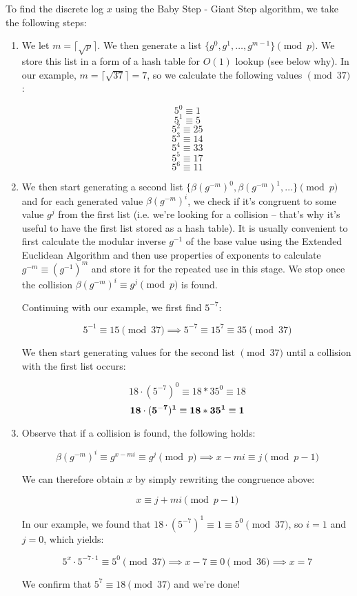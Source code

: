 \documentclass{article}
\begin{document}
      To find the discrete log $x$ using the Baby Step - Giant Step algorithm, we take the following steps:
      \begin{enumerate}

        \item We let $m = \lceil{\sqrt{p}}\rceil$. We then generate a list $\{g^0, g^1, \ldots, g^{m-1}\} \pmod{p}$. We store this list in a form of a hash table for $O(1)$ lookup (see below why). In our example, $m = \lceil{\sqrt{37}}\rceil = 7$, so we calculate the following values $\pmod{37}$:

          $$5^0 \equiv 1$$
          $$5^1 \equiv 5$$
          $$5^2 \equiv 25$$
          $$5^3 \equiv 14$$
          $$5^4 \equiv 33$$
          $$5^5 \equiv 17$$
          $$5^6 \equiv 11$$

        \item We then start generating a second list $\{\beta(g^{-m})^0, \beta(g^{-m})^1, \ldots\} \pmod{p}$ and for each generated value $\beta(g^{-m})^i$, we check if it's congruent to some value $g^j$ from the first list (i.e. we're looking for a collision -- that's why it's useful to have the first list stored as a hash table). It is usually convenient to first calculate the modular inverse $g^{-1}$ of the base value using the Extended Euclidean Algorithm and then use properties of exponents to calculate $g^{-m} \equiv (g^{-1})^m$ and store it for the repeated use in this stage. We stop once the collision $\beta(g^{-m})^i \equiv g^{j} \pmod{p}$ is found.

          Continuing with our example, we first find $5^{-7}$:

          $$5^{-1} \equiv 15 \pmod{37} \implies 5^{-7} \equiv 15^7 \equiv 35 \pmod{37}$$

          We then start generating values for the second list $\pmod{37}$ until a collision with the first list occurs:

          $$18 \cdot (5^{-7})^0 \equiv 18 * 35^0 \equiv 18$$
          $$\bf{18 \cdot (5^{-7})^1 \equiv 18 * 35^1 \equiv 1}$$

        \item Observe that if a collision is found, the following holds:

          $$\beta(g^{-m})^i \equiv g^{x-mi} \equiv g^{j} \pmod{p} \implies x-mi \equiv j \pmod{p-1}$$

          We can therefore obtain $x$ by simply rewriting the congruence above:

          $$x \equiv j + mi \pmod{p-1}$$

          In our example, we found that $18 \cdot (5^{-7})^1 \equiv 1 \equiv 5^0 \pmod{37}$, so $i = 1$ and $j = 0$, which yields:

          $$5^x \cdot 5^{-7 \cdot 1} \equiv 5^0 \pmod{37} \implies x-7 \equiv 0 \pmod{36} \implies x = 7$$

          We confirm that $5^7 \equiv 18 \pmod{37}$ and we're done!

      \end{enumerate}
\end{document}

